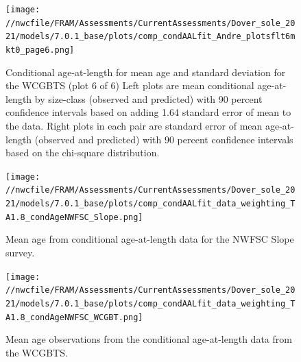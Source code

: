 \documentclass[11pt,
  english,
  a4paper,
]{article}
\begin{document}
\tagmcend\tagstructend


\begin{figure}
\centering
\texttt{[image: //nwcfile/FRAM/Assessments/CurrentAssessments/Dover\_sole\_2021/models/7.0.1\_base/plots/comp\_condAALfit\_Andre\_plotsflt6mkt0\_page6.png]}
\caption{Conditional age-at-length for mean age and standard deviation for the WCGBTS (plot 6 of 6) Left plots are mean conditional age-at-length by size-class (observed and predicted) with 90 percent confidence intervals based on adding 1.64 standard error of mean to the data. Right plots in each pair are standard error of mean age-at-length (observed and predicted) with 90 percent confidence intervals based on the chi-square distribution.\label{fig:wcgbt-caal-fit-6}}
\end{figure}

\tagmcend\tagstructend


\begin{figure}
\centering
\texttt{[image: //nwcfile/FRAM/Assessments/CurrentAssessments/Dover\_sole\_2021/models/7.0.1\_base/plots/comp\_condAALfit\_data\_weighting\_TA1.8\_condAgeNWFSC\_Slope.png]}
\caption{Mean age from conditional age-at-length data for the NWFSC Slope survey.\label{fig:nwslope-mean-caal}}
\end{figure}

\tagmcend\tagstructend


\begin{figure}
\centering
\texttt{[image: //nwcfile/FRAM/Assessments/CurrentAssessments/Dover\_sole\_2021/models/7.0.1\_base/plots/comp\_condAALfit\_data\_weighting\_TA1.8\_condAgeNWFSC\_WCGBT.png]}
\caption{Mean age observations from the conditional age-at-length data from the WCGBTS.\label{fig:wcgbt-mean-age}}
\end{figure}
\end{document}
